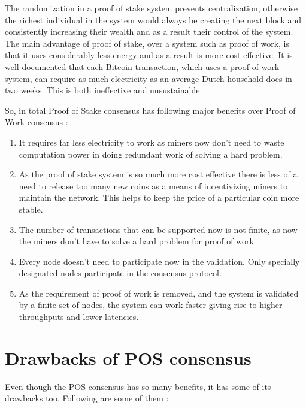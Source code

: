 The randomization in a proof of stake system prevents centralization, otherwise the richest individual in the system would always be creating the next block and consistently increasing their wealth and as a result their control of the system. The main advantage of proof of stake, over a system such as proof of work, is that it uses considerably less energy and as a result is more cost effective. It is well documented that each Bitcoin transaction, which uses a proof of work system, can require as much electricity as an average Dutch household does in two weeks. This is both ineffective and unsustainable.

So, in total Proof of Stake consensus has following major benefits over Proof of Work consensus :

\begin{enumerate}
    \item It requires far less electricity to work as miners now don't need to waste computation power in doing redundant work of solving a hard problem.
    \item As the proof of stake system is so much more cost effective there is less of a need to release too many new coins as a means of incentivizing miners to maintain the network. This helps to keep the price of a particular coin more stable.
    \item The number of transactions that can be supported now is not finite, as now the miners don't have to solve a hard problem for proof of work
    \item Every node doesn't need to participate now in the validation. Only specially designated nodes participate in the consensus protocol.
    \item As the requirement of proof of work is removed, and the system is validated by a finite set of nodes, the system can work faster giving rise to higher throughputs and lower latencies. 
\end{enumerate}

\section{Drawbacks of POS consensus}

Even though the POS consensus has so many benefits, it has some of its drawbacks too. Following are some of them :

